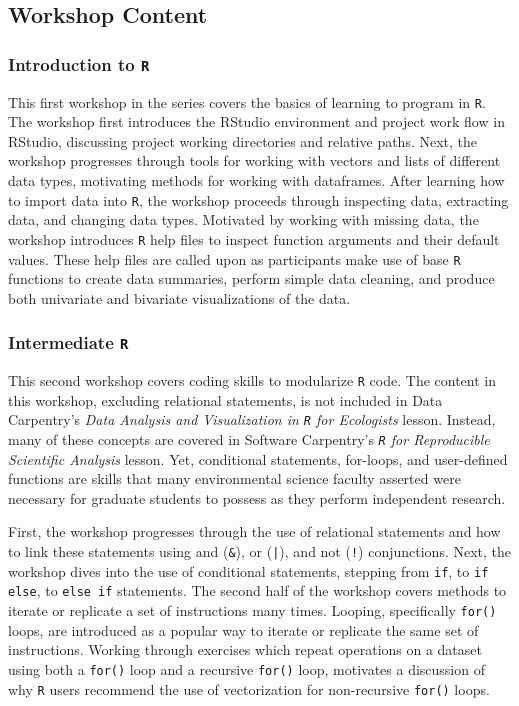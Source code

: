 \documentclass[12pt]{article}
\begin{document}
\subsection{Workshop Content}

\subsubsection{Introduction to \texttt{R}}
\label{sec:introR}

\quad This first workshop in the series covers the basics of learning to program
in \texttt{R}. The workshop first introduces the RStudio environment and project
work flow in RStudio, discussing project working directories and relative paths.
Next, the workshop progresses through tools for working with vectors and lists 
of different data types, motivating methods for working with dataframes. After
learning how to import data into \texttt{R}, the workshop proceeds through
inspecting data, extracting data, and changing data types. Motivated by working
with missing data, the workshop introduces \texttt{R} help files to inspect
function arguments and their default values. These help files are called upon
as participants make use of base \texttt{R} functions to create data summaries,
perform simple data cleaning, and produce both univariate and bivariate
visualizations of the data. 

\subsubsection{Intermediate \texttt{R}}
\label{sec:intermed}

\quad This second workshop covers coding skills to modularize \texttt{R} code. 
The content in this workshop, excluding relational statements, is not
included in Data Carpentry's \emph{Data Analysis and Visualization in \texttt{R}
for Ecologists} lesson. Instead, many of these concepts are covered in Software
Carpentry's \emph{\texttt{R} for Reproducible Scientific Analysis} lesson. Yet,
conditional statements, for-loops, and user-defined functions are skills that
many environmental science faculty asserted were necessary for graduate students
to possess as they perform independent research. 

\quad First, the workshop progresses through the use of relational
statements and how to link these statements using and (\texttt{\&}), or
(\texttt{|}), and not (\texttt{!}) conjunctions. Next, the workshop dives into
the use of conditional statements, stepping from \texttt{if}, to \texttt{if
else}, to \texttt{else if} statements. The second half of the workshop covers
methods to iterate or replicate a set of instructions many times. Looping,
specifically \texttt{for()} loops, are introduced as a popular way to iterate or
replicate the same set of instructions. Working through exercises which
repeat operations on a dataset using both a \texttt{for()} loop and a recursive 
\texttt{for()} loop, motivates a discussion of why \texttt{R} users recommend the
use of vectorization for non-recursive \texttt{for()} loops.
\end{document}
